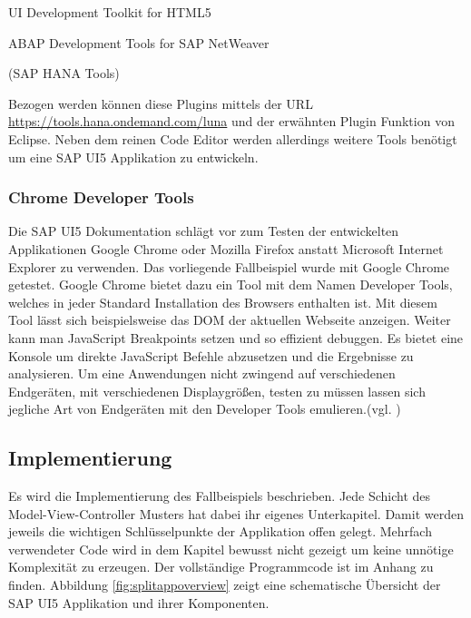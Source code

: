\vspace{1em}
\begin{compactitem}
    \item UI Development Toolkit for HTML5
    \item ABAP Development Tools for SAP NetWeaver
    \item (SAP HANA Tools)	    
\end{compactitem}
\vspace{1em}

Bezogen werden können diese Plugins mittels der URL \url{https://tools.hana.ondemand.com/luna} und der erwähnten Plugin Funktion von Eclipse. Neben dem reinen Code Editor werden allerdings weitere Tools benötigt um eine SAP UI5 Applikation zu entwickeln.

\subsubsection{Chrome Developer Tools}
Die SAP UI5 Dokumentation schlägt vor zum Testen der entwickelten Applikationen Google Chrome oder Mozilla Firefox anstatt Microsoft Internet Explorer zu verwenden. Das vorliegende Fallbeispiel wurde mit Google Chrome getestet. Google Chrome bietet dazu ein Tool mit dem Namen Developer Tools, welches in jeder Standard Installation des Browsers enthalten ist. Mit diesem Tool lässt sich beispielsweise das DOM der aktuellen Webseite anzeigen. Weiter kann man JavaScript Breakpoints setzen und so effizient debuggen. Es bietet eine Konsole um direkte JavaScript Befehle abzusetzen und die Ergebnisse zu analysieren. Um eine Anwendungen nicht zwingend auf verschiedenen Endgeräten, mit verschiedenen Displaygrößen, testen zu müssen lassen sich jegliche Art von Endgeräten mit den Developer Tools emulieren.(vgl. \cite{DevTools})



\subsection{Implementierung}
Es wird die Implementierung des Fallbeispiels beschrieben. Jede Schicht des Model-View-Controller Musters hat dabei ihr eigenes Unterkapitel. Damit werden jeweils die wichtigen Schlüsselpunkte der Applikation offen gelegt. Mehrfach verwendeter Code wird in dem Kapitel bewusst nicht gezeigt um keine unnötige Komplexität zu erzeugen. Der vollständige Programmcode ist im Anhang zu finden. Abbildung \ref{fig:splitappoverview} zeigt eine schematische Übersicht der SAP UI5 Applikation und ihrer Komponenten.

